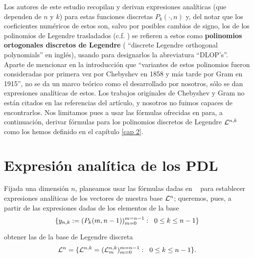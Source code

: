 Los autores de este estudio recopilan y derivan expresiones
analíticas (que dependen de $n$ y $k$) para estas funciones
discretas $P_{k}(\cdot ,n)$ y, del notar que los coeficientes
numéricos de estos son, salvo por posibles cambios de signo,
los de los polinomios de Legendre trasladados 
(c.f. \cite{leg})
se refieren a 
estos como \textbf{polinomios ortogonales
discretos de Legendre} (
``discrete Legendre orthogonal
polynomials'' en inglés), usando para designarlos la abreviatura
``DLOP's''. \\

Aparte de mencionar en la introducción que
``variantes de estos polinomios fueron consideradas por primera
vez por Chebyshev en 1858 y más tarde por Gram en 1915'', no se
da un marco teórico como el desarrollado por nosotros, sólo 
se dan expresiones analíticas de estos.
Los trabajos originales de Chebyshev y Gram
no están citados en las referencias del artículo, y 
nosotros no fuimos capaces de 
encontrarlos. Nos limitamos pues a usar las 
fórmulas ofrecidas en \cite{Neuman} para, a continuación,
derivar fórmulas para los polinomios discretos
de Legendre $\mathcal{L}^{n,k}$
como los hemos definido en el capítulo 
\ref{cap 2}.


\section{Expresión analítica de los PDL}
Fijada una dimensión $n$, planeamos usar 
las fórmulas dadas 
en ~\cite{Neuman}
para establecer expresiones analíticas
de los vectores de nuestra base $\mathcal{L}^{n}$; queremos,
pues, a partir de las expresiones dadas de los
elementos de la base
\begin{equation}
\label{eq: base DLOP}
\{
y_{n,k}:= (P_{k}(m, n-1))_{m=0}^{m=n-1}
: \hspace{0.2cm} 0 \leq k \leq n-1
\}
\end{equation}

\noindent
obtener las de la base de Legendre discreta
\begin{equation}
\label{eq: base Legendre}
\mathcal{L}^{n}=
\{
\mathcal{L}^{n,k}= (\mathcal{L}^{n,k}_{m})_{m=0}^{m=n-1}
: \hspace{0.2cm} 0 \leq k \leq n-1
\}.
\end{equation}


